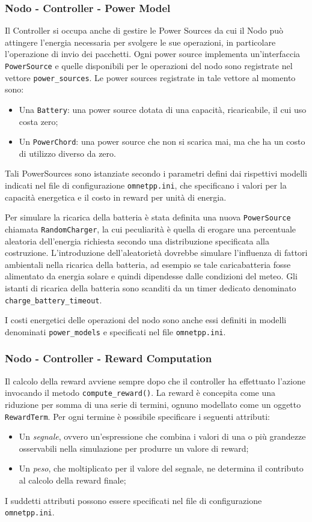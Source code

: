 \documentclass[conference]{IEEEtran}
\newcommand{\code}[1]{\texttt{#1}}
\begin{document}
\subsubsection{Nodo - Controller - Power Model}
Il Controller si occupa anche di gestire le Power Sources da cui il Nodo può attingere
l'energia necessaria per svolgere le sue operazioni, in particolare l'operazione di 
invio dei pacchetti. Ogni power source implementa un'interfaccia \code{PowerSource}
e quelle disponibili per le operazioni del nodo sono registrate nel vettore
\code{power\_sources}. Le power sources registrate in tale vettore al momento sono: 
\begin{itemize}
    \item Una \code{Battery}: una power source dotata di una capacità, ricaricabile, il
    cui uso costa zero;
    \item Un \code{PowerChord}: una power source che non si scarica mai, ma che ha un
    costo di utilizzo diverso da zero.
\end{itemize}
Tali PowerSources sono istanziate secondo i parametri defini dai rispettivi modelli
indicati nel file di configurazione \code{omnetpp.ini}, che specificano
i valori per la capacità energetica e il costo in reward per unità di energia.

Per simulare la ricarica della batteria è stata definita una nuova \code{PowerSource}
chiamata \code{RandomCharger}, la cui peculiarità è quella di erogare una percentuale
aleatoria dell'energia richiesta secondo una distribuzione specificata alla costruzione.
L'introduzione dell'aleatorietà dovrebbe simulare l'influenza di fattori ambientali
nella ricarica della batteria, ad esempio se tale caricabatteria fosse alimentato da
energia solare e quindi dipendesse dalle condizioni del meteo. Gli istanti di ricarica
della batteria sono scanditi da un timer dedicato denominato
\code{charge\_battery\_timeout}.

I costi energetici delle operazioni del nodo sono anche essi definiti in modelli 
denominati \code{power\_models} e specificati nel file \code{omnetpp.ini}. 

\subsubsection{Nodo - Controller - Reward Computation}

Il calcolo della reward avviene sempre dopo che il controller ha effettuato l'azione
invocando il metodo \code{compute\_reward()}.
La reward è concepita come una riduzione per somma di una serie di termini, ognuno
modellato come un oggetto \code{RewardTerm}. Per ogni termine è possibile specificare
i seguenti attributi:
\begin{itemize}
    \item Un \textit{segnale}, ovvero un'espressione che combina i valori di una o più grandezze osservabili nella simulazione per produrre un valore di reward;
    \item Un \textit{peso}, che moltiplicato per il valore del segnale, ne determina il
    contributo al calcolo della reward finale;
\end{itemize}
I suddetti attributi possono essere specificati nel file di configurazione
\code{omnetpp.ini}.
\end{document}
